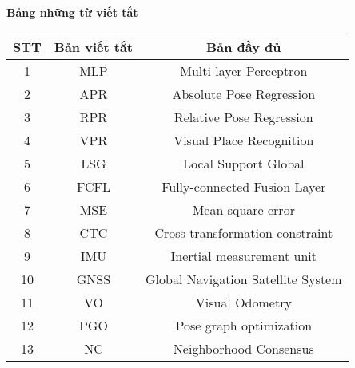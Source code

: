 \titlepage \null
	\small
	\begin{center}
	  {\bfseries Bảng những từ viết tắt\vspace{-.5em}}
	\end{center}
	\quotation
\begin{table}[h]
\centering
\begin{tabular}{|c|c|c|}
\hline
\textbf{STT} & \textbf{Bản viết tắt}                & \textbf{Bản đầy đủ}     \\ \hline
1            & MLP                  & Multi-layer Perceptron        \\ \hline
2            & APR                  & Absolute Pose Regression      \\ \hline
3            & RPR                  & Relative Pose Regression      \\ \hline
4            & VPR                  & Visual Place Recognition      \\ \hline
5            & LSG                  & Local Support Global          \\ \hline
6            & FCFL                 & Fully-connected Fusion Layer  \\ \hline
7            & MSE                  & Mean square error             \\ \hline
8            & CTC                  & Cross transformation constraint \\ \hline
9		& IMU		& Inertial measurement unit	\\ \hline
10		& GNSS		& Global Navigation Satellite System \\ \hline
11		& VO			& Visual Odometry	\\ \hline
12      & PGO       & Pose graph optimization   \\ \hline
13	 & NC 	 & Neighborhood Consensus	\\ \hline
\end{tabular}
\end{table}

